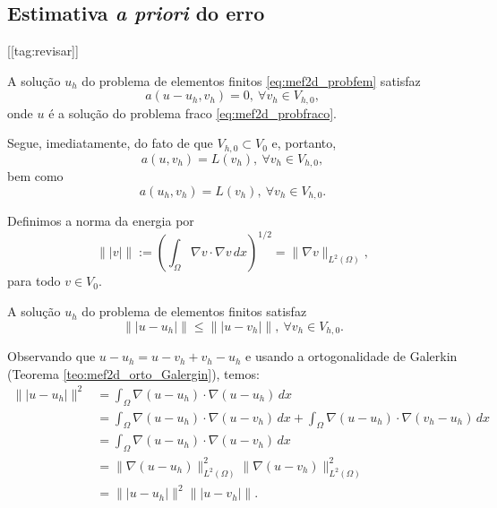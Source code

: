 \subsection{Estimativa {\it a priori} do erro}
[[tag:revisar]]


\begin{teo}\label{teo:mef2d_orto_Galergin}
  A solução $u_h$ do problema de elementos finitos \eqref{eq:mef2d_probfem} satisfaz
  \begin{equation}
    a(u-u_h,v_h) = 0,~\forall v_h\in V_{h,0},
  \end{equation}
onde $u$ é a solução do problema fraco \eqref{eq:mef2d_probfraco}.
\end{teo}
\begin{dem}
  Segue, imediatamente, do fato de que $V_{h,0}\subset V_0$ e, portanto,
  \begin{equation}
    a(u,v_h) = L(v_h),~\forall v_h\in V_{h,0},
  \end{equation}
bem como
  \begin{equation}
    a(u_h,v_h) = L(v_h),~\forall v_h\in V_{h,0}.
  \end{equation}
\end{dem}

\begin{defn}
  Definimos a norma da energia por
  \begin{equation}
    \||v|\| := \left(\int_{\Omega} \nabla v\cdot\nabla v\,dx\right)^{1/2} = \|\nabla v\|_{L^2(\Omega)},
  \end{equation}
para todo $v\in V_0$.
\end{defn}

\begin{teo}\label{teo:mef2d_melhor_aprox}
  A solução $u_h$ do problema de elementos finitos satisfaz
  \begin{equation}
    \||u-u_h|\| \leq \||u-v_h|\|,~\forall v_h\in V_{h,0}.
  \end{equation}
\end{teo}
\begin{dem}
  Observando que $u-u_h=u-v_h+v_h-u_h$ e usando a ortogonalidade de Galerkin (Teorema \ref{teo:mef2d_orto_Galergin}), temos:
  \begin{align}
    \||u-u_h|\|^2 &= \int_\Omega \nabla (u-u_h)\cdot\nabla (u-u_h)\,dx\\
    &= \int_{\Omega} \nabla (u-u_h)\cdot\nabla (u-v_h)\,dx + \int_{\Omega} \nabla (u-u_h)\cdot\nabla (v_h-u_h)\,dx\\
    &= \int_{\Omega} \nabla (u-u_h)\cdot\nabla (u-v_h)\,dx\\
    &= \|\nabla (u-u_h)\|_{L^2(\Omega)}^2\|\nabla (u-v_h)\|_{L^2(\Omega)}^2\\
    &= \||u-u_h|\|^2\||u-v_h|\|.
  \end{align}
\end{dem}

